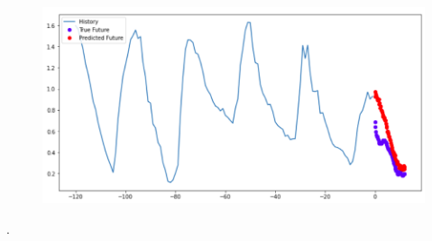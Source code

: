 \begin{center}
	\begin{figure}[htp]
		\begin{center}
			\includegraphics[scale=0.5]{./images/14.png}
		\end{center}
	\end{figure}
\end{center}

\newpage
.